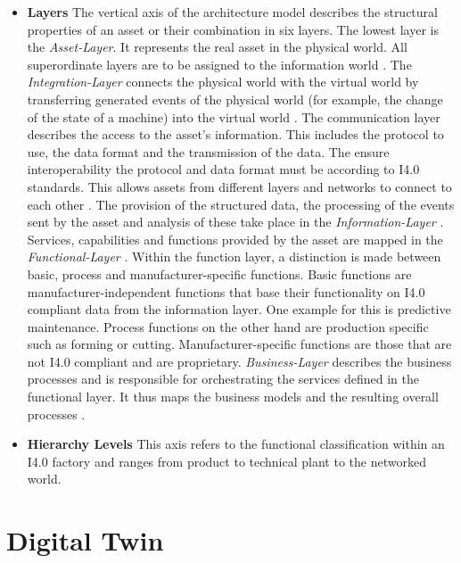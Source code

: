 \begin{itemize}
    \item[] \textbf{Layers} The vertical axis of the architecture model describes the structural properties of an asset or their combination in six layers. The lowest layer is the \textit{Asset-Layer}. It represents the real asset in the physical world. All superordinate layers are to be assigned to the information world \cite[p. 46]{Heidel2017ReferenzarchitekturmodellIndustrie4.0Komponente}. The \textit{Integration-Layer} connects the physical world with the virtual world by transferring generated events of the physical world (for example, the change of the state of a machine) into the virtual world \cite[p. 47]{Heidel2017ReferenzarchitekturmodellIndustrie4.0Komponente}. The communication layer describes the access to the asset's information. This includes the protocol to use, the data format and the transmission of the data. The ensure interoperability the protocol and data format must be according to \ac{I4.0} standards. This allows assets from different layers and networks to connect to each other \cite[p. 47,48]{Heidel2017ReferenzarchitekturmodellIndustrie4.0Komponente}. The provision of the structured data, the processing of the events sent by the asset and analysis of these take place in the \textit{Information-Layer} \cite[p. 51]{Heidel2017ReferenzarchitekturmodellIndustrie4.0Komponente}. Services, capabilities and functions provided by the asset are mapped in the \textit{Functional-Layer} \cite[p. 51]{Heidel2017ReferenzarchitekturmodellIndustrie4.0Komponente}. Within the function layer, a distinction is made between basic, process and manufacturer-specific functions. Basic functions are manufacturer-independent functions that base their functionality on \ac{I4.0} compliant data from the information layer. One example for this is predictive maintenance. Process functions on the other hand are production specific such as forming or cutting. Manufacturer-specific functions are those that are not \ac{I4.0} compliant and are proprietary. \textit{Business-Layer} describes the business processes and is responsible for orchestrating the services defined in the functional layer. It thus maps the business models and the resulting overall processes \cite[p. 53]{Heidel2017ReferenzarchitekturmodellIndustrie4.0Komponente}.
    \item[] \textbf{Hierarchy Levels} This axis refers to the functional classification within an \ac{I4.0} factory and ranges from product to technical plant to the networked world.
\end{itemize}

\section{Digital Twin}



